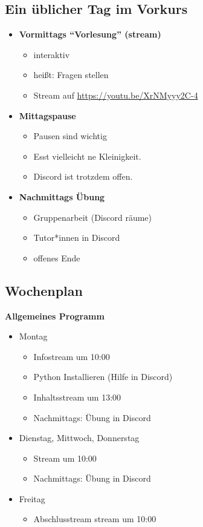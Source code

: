 \subsection{Ein üblicher Tag im Vorkurs}
\begin{frame}
	\slidehead
	\begin{itemize}
		\item \textbf{Vormittags "`Vorlesung"' (stream)}
		\begin{itemize}
			\item interaktiv
			\item heißt: Fragen stellen
			\item Stream auf \href{https://youtu.be/XrNMyyy2C-4}{https://youtu.be/XrNMyyy2C-4}
		\end{itemize}
		\item \textbf{Mittagspause}
		\begin{itemize}
			\item Pausen sind wichtig
			\item Esst vielleicht ne Kleinigkeit.
			\item Discord ist trotzdem offen.
		\end{itemize}
		\item \textbf{Nachmittags Übung}
		\begin{itemize}
			\item Gruppenarbeit (Discord räume)
			\item Tutor*innen in Discord
			\item offenes Ende
		\end{itemize}
	\end{itemize}
\end{frame}

\subsection{Wochenplan}
\begin{frame}
	\slidehead
	\textbf{Allgemeines Programm}
	\begin{itemize}
		\item Montag
		\begin{itemize}
			\item Infostream um 10:00
			\item Python Installieren (Hilfe in Discord)
			\item Inhaltsstream um 13:00
			\item Nachmittags: Übung in Discord
		\end{itemize}
		\item Dienstag, Mittwoch, Donnerstag
		\begin{itemize}
			\item Stream um 10:00
			\item Nachmittags: Übung in Discord
		\end{itemize}
		\item Freitag
		\begin{itemize}
			\item Abschlusstream stream um 10:00
		\end{itemize}
	\end{itemize}
\end{frame}

